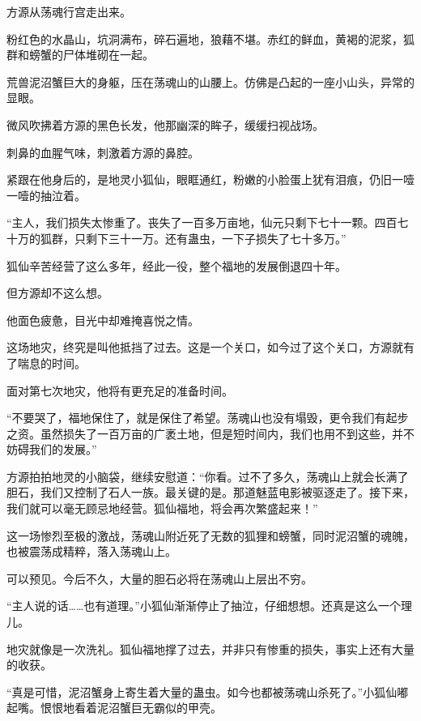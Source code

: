 
\begin{this_body}



方源从荡魂行宫走出来。

粉红色的水晶山，坑洞满布，碎石遍地，狼藉不堪。赤红的鲜血，黄褐的泥浆，狐群和螃蟹的尸体堆砌在一起。

荒兽泥沼蟹巨大的身躯，压在荡魂山的山腰上。仿佛是凸起的一座小山头，异常的显眼。

微风吹拂着方源的黑色长发，他那幽深的眸子，缓缓扫视战场。

刺鼻的血腥气味，刺激着方源的鼻腔。

紧跟在他身后的，是地灵小狐仙，眼眶通红，粉嫩的小脸蛋上犹有泪痕，仍旧一噎一噎的抽泣着。

“主人，我们损失太惨重了。丧失了一百多万亩地，仙元只剩下七十一颗。四百七十万的狐群，只剩下三十一万。还有蛊虫，一下子损失了七十多万。”

狐仙辛苦经营了这么多年，经此一役，整个福地的发展倒退四十年。

但方源却不这么想。

他面色疲惫，目光中却难掩喜悦之情。

这场地灾，终究是叫他抵挡了过去。这是一个关口，如今过了这个关口，方源就有了喘息的时间。

面对第七次地灾，他将有更充足的准备时间。

“不要哭了，福地保住了，就是保住了希望。荡魂山也没有塌毁，更令我们有起步之资。虽然损失了一百万亩的广袤土地，但是短时间内，我们也用不到这些，并不妨碍我们的发展。”

方源拍拍地灵的小脑袋，继续安慰道：“你看。过不了多久，荡魂山上就会长满了胆石，我们又控制了石人一族。最关键的是。那道魅蓝电影被驱逐走了。接下来，我们就可以毫无顾忌地经营。狐仙福地，将会再次繁盛起来！”

这一场惨烈至极的激战，荡魂山附近死了无数的狐狸和螃蟹，同时泥沼蟹的魂魄，也被震荡成精粹，落入荡魂山上。

可以预见。今后不久，大量的胆石必将在荡魂山上层出不穷。

“主人说的话……也有道理。”小狐仙渐渐停止了抽泣，仔细想想。还真是这么一个理儿。

地灾就像是一次洗礼。狐仙福地撑了过去，并非只有惨重的损失，事实上还有大量的收获。

“真是可惜，泥沼蟹身上寄生着大量的蛊虫。如今也都被荡魂山杀死了。”小狐仙嘟起嘴。恨恨地看着泥沼蟹巨无霸似的甲壳。


\end{this_body}

